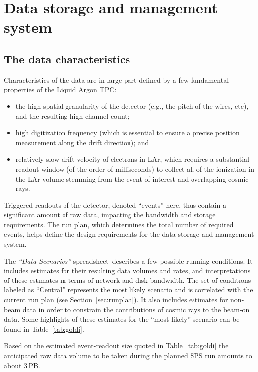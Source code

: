 \section{Data storage and management system}

\subsection{The \pdsp data characteristics}
Characteristics of the \pdsp data are in large part defined by a few fundamental
properties of the \pdsp Liquid Argon TPC:
\begin{itemize}
\item the high spatial granularity of the detector (e.g., the pitch of the wires, etc), and the resulting high channel count;
\item high digitization frequency (which is essential to ensure a precise position measurement along the drift direction); and
\item relatively slow drift velocity of electrons in LAr, which requires a substantial readout window (of the order of milliseconds)  to collect
all of the ionization in the LAr volume stemming from the event of interest and overlapping cosmic rays.
\end{itemize}

Triggered readouts of the detector, denoted ``events'' here, 
thus contain a significant amount of raw data, impacting the bandwidth and
storage requirements.   The run plan, which determines the total number of required events, 
helps define the design requirements for the data storage and management system.

The \textit{``\pdsp Data Scenarios''} spreadsheet\,\cite{data_spreadsheet}  %
describes a few possible running conditions. It includes estimates for their
resulting data volumes and rates, and interpretations of these estimates in terms of
network and disk bandwidth. The set of conditions labeled as ``Central'' represents the most likely scenario
and is correlated with the current run plan (see Section~\ref{sec:runplan}).
 It also includes estimates for non-beam
data in order to constrain the contributions of cosmic rays to the beam-on data.  Some highlights
of these estimates for the ``most likely'' scenario
can be found in Table~\ref{tab:goldi}.

Based on the estimated event-readout size quoted in Table~\ref{tab:goldi}  the anticipated raw data volume to be taken during the planned SPS run
amounts to about 3\,PB.


